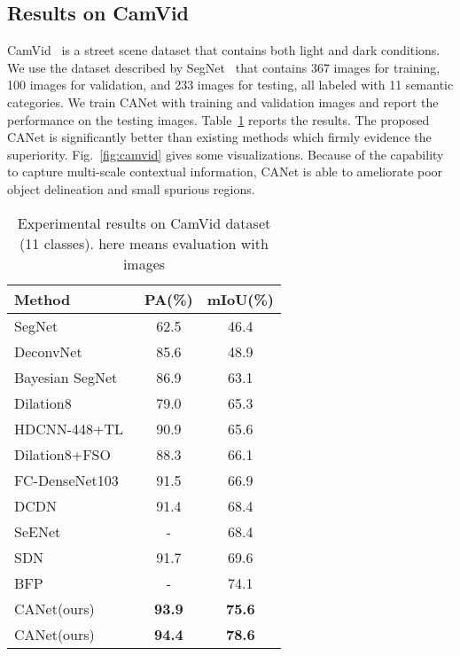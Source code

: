 \documentclass[journal]{IEEEtran}
\begin{document}
\subsection{Results on CamVid}
CamVid~\cite{brostow2009semantic} is a street scene dataset that contains both light and dark conditions. We use the dataset described by SegNet~\cite{badrinarayanan2017segnet} that contains 367 images for training, 100 images for validation, and 233 images for testing, all labeled with 11 semantic categories. We train CANet with training and validation images and report the performance on the testing images. Table~\ref{table:camvid} reports the results. The proposed CANet is significantly better than existing methods which firmly evidence the superiority. Fig.~\ref{fig:camvid} gives some visualizations. Because of the capability to capture multi-scale contextual information, CANet is able to ameliorate poor object delineation and small spurious regions.
\begin{table}
\caption{Experimental results on CamVid dataset (11 classes).  here means evaluation with  images}
\begin{center}
    \begin{tabular}{l|cc}
    \toprule
        \textbf{Method} & \textbf{PA(\%)} & \textbf{mIoU(\%)} \\
    \midrule\midrule
        SegNet~\cite{badrinarayanan2017segnet} & 62.5 & 46.4 \\
        DeconvNet~\cite{noh2015learning} & 85.6 & 48.9 \\
        Bayesian SegNet~\cite{kendall2015bayesian} & 86.9 & 63.1 \\
        Dilation8~\cite{yu2015multi} & 79.0 & 65.3 \\
        HDCNN-448+TL~\cite{wang2017hierarchically} & 90.9 & 65.6 \\
        Dilation8+FSO~\cite{kundu2016feature} & 88.3 & 66.1 \\
        FC-DenseNet103~\cite{jegou2017one} & 91.5 & 66.9 \\
        DCDN~\cite{fu2017densely} & 91.4 & 68.4 \\
        SeENet~\cite{pang2019towards} & - & 68.4 \\
        SDN~\cite{fu2019stacked} & 91.7 & 69.6 \\
        BFP~\cite{ding2019boundary} & - & 74.1 \\
    \midrule
        CANet(ours) & \textbf{93.9} & \textbf{75.6} \\
        CANet(ours) & \textbf{94.4} & \textbf{78.6} \\
    \bottomrule
    \end{tabular}
\end{center}
\label{table:camvid}
\end{table}
\end{document}
